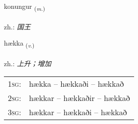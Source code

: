 \documentclass[frontgrid, backgrid]{flacards}\usepackage[]{graphicx}\usepackage[]{xcolor}
\begin{document}
\renewcommand{\blhead}{\vskip5pt {\small\bfseries\footnotesize Nafnorð | 名词 }}
\renewcommand{\bcfoot}{\vskip5pt \hspace{2pt}{\small\bfseries\footnotesize 1K}}


{konungur \small{\textsubscript{(\textit{m.})}} \\[1ex] %
\textphonetic{[kʰɔːnuŋkʏr]} \\
zh.: \emph{国王} \\  [2ex]
\renewcommand*{\arraystretch}{0.8}
}

\renewcommand{\flhead}{\vskip5pt \fboxsep=0pt {\small\bfseries\footnotesize Sagnorð | 动词}}
\renewcommand{\fcfoot}{\vskip5pt \fboxsep=0pt \hspace{2pt}{\small\bfseries\footnotesize 1K}}

\renewcommand{\blhead}{\vskip5pt {\small\bfseries\footnotesize Sagnorð | 动词 }}
\renewcommand{\bcfoot}{\vskip5pt \hspace{2pt}{\small\bfseries\footnotesize 1K}}


{hækka \small{\textsubscript{(\textit{v.})}} \\[1ex] %
\textphonetic{[haihka]} \\
zh.: \emph{上升；增加} \\  [2ex]
\renewcommand*{\arraystretch}{0.8}
\begin{tabular}{p{1cm}l}
\textsc{1sg}: & hækka -- hækkaði -- hækkað \\ 
\textsc{2sg}: & hækkar -- hækkaðir -- hækkað \\ 
\textsc{3sg}: & hækkar -- hækkaði -- hækkað \\ 
\end{tabular}
}

\renewcommand{\flhead}{\vskip5pt \fboxsep=0pt {\small\bfseries\footnotesize Atviksorð | 副词}}
\renewcommand{\fcfoot}{\vskip5pt \fboxsep=0pt \hspace{2pt}{\small\bfseries\footnotesize 1K}}
\end{document}
